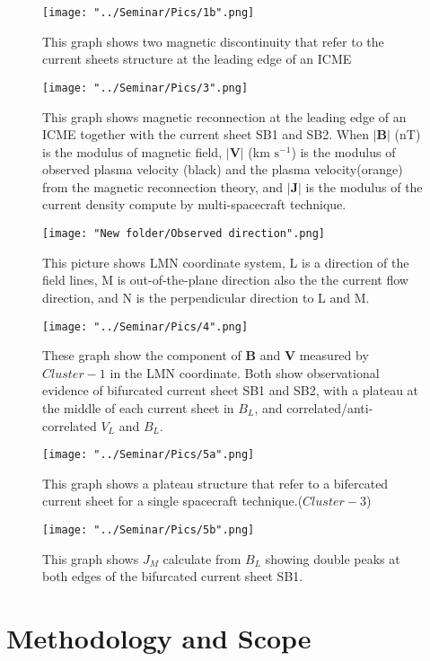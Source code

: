 \documentclass[12pt, a4paper]{article}
\begin{document}
		\begin{figure}[h!]
		\centering
		\texttt{[image: "../Seminar/Pics/1b".png]}
		\caption{This graph shows two magnetic discontinuity that refer to the current sheets structure at the leading edge of an ICME}
		\end{figure}
		\newpage
		\begin{figure}[h!]
		\centering
		\texttt{[image: "../Seminar/Pics/3".png]}
		\caption{This graph shows magnetic reconnection at the leading edge of an ICME together with the current sheet SB1 and SB2. When $\vert \mathbf{B}\vert$ (nT) is the modulus of magnetic field, $\vert \mathbf{V}\vert$ (km $\text{s}^{-1}$) is the modulus of observed plasma velocity (black) and the plasma velocity(orange) from the magnetic reconnection theory, and $\vert \mathbf{J}\vert$ is the modulus of the current density compute by multi-spacecraft technique. }
		\end{figure}
		\begin{figure}[h!]
		\centering
		\texttt{[image: "New folder/Observed direction".png]}
		\caption{This picture shows LMN coordinate system, L is a direction of the field lines, M is out-of-the-plane direction also the the current flow direction, and N is the perpendicular direction to L and M.}
		\end{figure}		
		\begin{figure}[h!]
		\centering
		\texttt{[image: "../Seminar/Pics/4".png]}
		\caption{These graph show the component of $\mathbf{B}$ and $\textbf{V}$ measured by $Cluster-1$ in the LMN coordinate. Both show observational evidence of bifurcated current sheet SB1 and SB2, with a plateau at the middle of each current sheet in $B_L$, and correlated/anti-correlated $V_L$ and $B_L$.}
		\end{figure}
		\begin{figure}[h!]
		\centering
		\texttt{[image: "../Seminar/Pics/5a".png]}
		\caption{This graph shows a plateau structure that refer to a bifercated current sheet for a single spacecraft technique.($Cluster-3$)}
		\end{figure}
		\begin{figure}[h!]
		\centering
		\texttt{[image: "../Seminar/Pics/5b".png]}
		\caption{This graph shows $J_M$ calculate from $B_L$ showing double peaks at both edges of the bifurcated current sheet SB1.}
		\end{figure}
		
\newpage
\section{Methodology and Scope}
\end{document}

